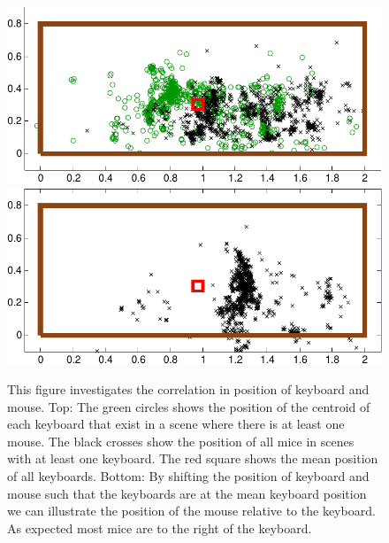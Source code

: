 \documentclass[letterpaper, 10 pt, conference]{ieeeconf}  %
\begin{document}
\begin{figure}
\begin{center}
\includegraphics[width=0.8\linewidth]{keyboard_mouse_raw-crop}
\includegraphics[width=0.8\linewidth]{keyboard_mouse-crop}
\end{center}
\label{fig:scatter-keyboard-mouse}
\caption{This figure investigates the correlation in position of keyboard and mouse. Top: The green circles shows the position of the centroid of each keyboard that exist in a scene where there is at least one mouse. The black crosses show the position of all mice in scenes with at least one keyboard. The red square shows the mean position of all keyboards. Bottom: By shifting the position of keyboard and mouse such that the keyboards are at the mean keyboard position we can illustrate the position of the mouse relative to the keyboard. As expected most mice are to the right of the keyboard.} 
\end{figure}
\end{document}
